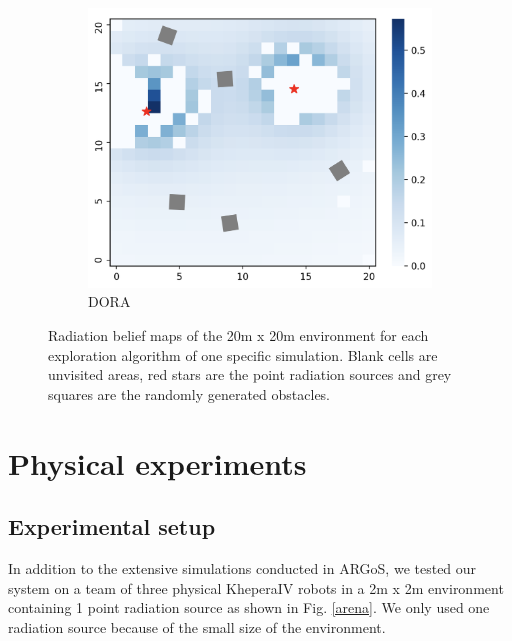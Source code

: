 \documentclass[letterpaper, 10 pt, conference]{ieeeconf}
\begin{document}
\begin{figure}
    \begin{subfigure}{0.32\textwidth}
        \includegraphics[width=\textwidth]{images/heatmap_dora.png}
        \caption{DORA}
        \label{results:beliefdora}
    \end{subfigure}
    \caption{Radiation belief maps of the 20m x 20m environment for each exploration algorithm of one specific simulation. Blank cells are unvisited areas, red stars are the point radiation sources and grey squares are the randomly generated obstacles.}
    \label{results:belief}
\end{figure}


\section{Physical experiments}
\subsection{Experimental setup}
In addition to the extensive simulations conducted in ARGoS, we tested
our system on a team of three physical KheperaIV robots in a 2m x 2m
environment containing 1 point radiation source as shown in
Fig. \ref{arena}. We only used one radiation source because of the small size of the environment.
\end{document}
